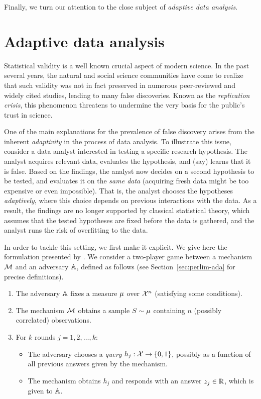 \documentclass[12pt,a4paper,oneside,onecolumn]{book}
\begin{document}
Finally, we turn our attention to the close subject of \emph{adaptive data analysis}. 


\section{Adaptive data analysis}

Statistical validity is a well known crucial aspect of modern science.
In the past several years, the natural and social science communities
have come to realize that such validity was not in fact preserved
in numerous peer-reviewed and widely cited studies, leading to many false discoveries. Known as the {\em replication crisis}, 
this phenomenon threatens to undermine the very basis for the public's trust in science.

One of the main explanations for the prevalence of false discovery arises from the inherent {\em adaptivity} in the process of data
analysis. To illustrate this issue, consider a data analyst interested
in testing a specific research hypothesis. The analyst acquires relevant data, evaluates
the hypothesis, and (say) learns that it is false. Based on the findings, the analyst now
decides on a second hypothesis to be tested, and evaluates it on the {\em same data} (acquiring
fresh data might be too expensive or even impossible). That is, the analyst chooses the
hypotheses {\em adaptively}, where this choice depends on previous interactions with the data.
As a result, the findings are no longer supported by classical statistical theory, which
assumes that the tested hypotheses are fixed before the data is gathered, and the analyst runs the risk of overfitting to the data.

In order to tackle this setting, we first make it explicit. We give here the formulation presented by \citet{dwork2015preserving}. We consider a two-player game between a mechanism $\mathcal{M}$ and an adversary $\mathbb{A}$, defined as follows (see Section~\ref{sec:perlim-ada} for precise definitions).
\begin{enumerate}
    \item The adversary $\mathbb{A}$ fixes a measure $\mu$ over $\mathcal{X}^n$ (satisfying some conditions).
    \item The mechanism $\mathcal{M}$ obtains a sample $S\sim\mu$ containing $n$ (possibly correlated) observations.
    \item For $k$ rounds $j=1,2,\dots,k$:
    \begin{itemize}
        \item The adversary chooses a {\em query} $h_j:\mathcal{X}\rightarrow\{0,1\}$, possibly as a function of all previous answers given by the mechanism.
        \item The mechanism obtains $h_j$ and responds with an answer $z_j\in\mathbb{R}$, which is given to $\mathbb{A}$.
    \end{itemize}
\end{enumerate}
\end{document}
